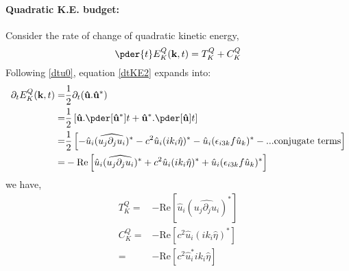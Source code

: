 \paragraph{Quadratic K.E. budget:}
Consider the rate of change of quadratic kinetic energy,
\begin{equation}\label{dtKE2}
    \pder{t}E_K^{Q}(\mathbf{k},t) = T_K^{Q} + C_K^{Q}
\end{equation}
Following \eqref{dtu0}, equation \eqref{dtKE2} expands into:
\begin{align*}
    \partial_t E_K^{Q}(\mathbf{k},t)
    = & \frac{1}{2}\partial_t(\mathbf{\hat u}.\mathbf{\hat u^*})       \\
    = & \frac{1}{2}\left[ \mathbf{\hat u} .\pder[\mathbf{\hat u^*}]{t}
        + \mathbf{\hat u^*}. \pder[\mathbf{\hat u}]{t}\right]          \\
    = & \frac{1}{2}\left[ -\hat{u}_i (\widehat{ u_j\partial_j u_i })^*
        - c^2 \hat{u}_i (ik_i \hat{\eta})^*
        - \hat{u}_i (\epsilon_{i3k} f \hat{u}_k)^*
        - ... \text{conjugate terms}
        \right]                                                        \\
    = & -\text{Re}\left[ \hat{u}_i (\widehat{ u_j\partial_j u_i })^*
        + c^2 \hat{u}_i (ik_i \hat{\eta})^*
        + \hat{u}_i (\epsilon_{i3k} f \hat{u}_k)^* \right]
\end{align*}
we have,
\begin{align}
    T_K^{Q}= & -\text{Re}\left[\hat{u}_i (\widehat{ u_j\partial_j u_i })^*
        \right]                                                              \\
    C_K^{Q}= & -\text{Re}\left[   c^2 \hat{u}_i (ik_i \hat{\eta})^*  \right] \\
    =        & -\text{Re}\left[   c^2 \hat{u}_i^* ik_i \hat{\eta} \right]
\end{align}

